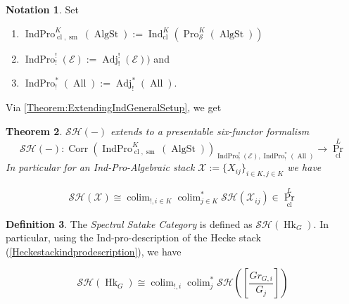 \documentclass[14pt]{article}
\newtheorem{theorem}{Theorem}[subsection]
\theoremstyle{definition}
\newtheorem{definition}[theorem]{Definition}
\newtheorem{notation}[theorem]{Notation}
\newcommand{\E}{\mathcal{E}}
\newcommand{\op}[1]{\operatorname{#1}}
\renewcommand{\S}{\mathcal{S}}
\newcommand{\X}{\mathcal{X}}
\numberwithin{subsection}{section}
\newcommand{\SH}{\mathcal{SH}}
\begin{document}
\begin{notation}
    Set 
    \begin{enumerate}
        \item   $\op{IndPro}^K_{\op{cl},\op{sm}}(\op{AlgSt}):= \op{Ind}^K_{\op{cl}}(\op{Pro}^K_{\S}(\op{AlgSt}))$
        \item  $\op{IndPro}^!_!(\E):= \op{Adj}^!_!(\E))$ and
        \item $\op{IndPro}^*_!(\op{All}) := \op{Adj}^*_!(\op{All})$.
    \end{enumerate}
   
\end{notation}

Via \cref{Theorem:ExtendingIndGeneralSetup}, we get
\begin{theorem}\label{theorem:sixfuncindproSH}
    $\SH(-)$ extends to a presentable six-functor formalism
    \begin{equation}
        \SH(-) : \op{Corr}(\op{IndPro}^K_{\op{cl},\op{sm}}(\op{AlgSt}))_{\op{IndPro}^!_!(\E),\op{IndPro}^*_!(\op{All})} \to \op{Pr}^L_{\op{cl}}
    \end{equation}
    In particular for an Ind-Pro-Algebraic stack $\X:=\{X_{ij}\}_{i \in K,j\in K}$ we have

\begin{equation}
    \SH(\X) \cong \op{colim}_{!,i \in K}\op{colim}^*_{j \in K}\SH(\X_{ij}) \in \op{Pr}^L_{\op{cl}}
\end{equation}
\end{theorem}

\begin{definition}
The \textit{Spectral Satake Category} is defined as $\SH(\op{Hk}_G)$. In particular, using the Ind-pro-description of the Hecke stack (\cref{Heckestackindprodescription}), we have

\begin{equation}
    \SH(\op{Hk}_G) \cong \op{colim}_{!,i} \op{colim}^*_{j} \SH([\frac{Gr_{G,i}}{G_j}])
\end{equation}

\end{definition}
\end{document}
